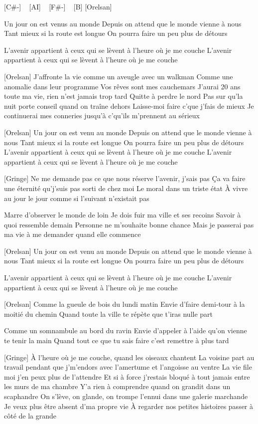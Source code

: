  
[C#-] ~ [AI] ~ [F#-] ~ [B]
 [Orelsan]

Un jour on est venus au monde
Depuis on attend que le monde vienne à nous
Tant mieux si la route est longue
On pourra faire un peu plus de détours

L'avenir appartient à ceux qui se lèvent à l'heure où je me couche
L'avenir appartient à ceux qui se lèvent à l'heure où je me couche

[Orelsan]
J'affronte la vie comme un aveugle avec un walkman
Comme une anomalie dans leur programme
Vos rêves sont mes cauchemars
J'aurai 20 ans toute ma vie, rien n'est jamais trop tard
Quitte à perdre le nord
Pas sur qu'la nuit porte conseil quand on traîne dehors
Laisse-moi faire c'que j'fais de mieux
Je continuerai mes conneries jusqu'à c'qu'ils m'prennent au sérieux


[Orelsan]
Un jour on est venu au monde
Depuis on attend que le monde vienne à nous
Tant mieux si la route est longue
On pourra faire un peu plus de détours
L'avenir appartient à ceux qui se lèvent à l'heure où je me couche
L'avenir appartient à ceux qui se lèvent à l'heure où je me couche

[Gringe]
Ne me demande pas ce que nous réserve l'avenir, j'sais pas
Ça va faire une éternité qu'j'suis pas sorti de chez moi
Le moral dans un triste état
À vivre au jour le jour comme si l'suivant n'existait pas

Marre d'observer le monde de loin
Je dois fuir ma ville et ses recoins
Savoir à quoi ressemble demain
Personne ne m'souhaite bonne chance
Mais je passerai pas ma vie à me demander quand elle commence

[Orelsan]
Un jour on est venu au monde
Depuis on attend que le monde vienne à nous
Tant mieux si la route est longue
On pourra faire un peu plus de détours

L'avenir appartient à ceux qui se lèvent à l'heure où je me couche
L'avenir appartient à ceux qui se lèvent à l'heure où je me couche


[Orelsan]
Comme la gueule de bois du lundi matin
Envie d'faire demi-tour à la moitié du chemin
Quand toute la ville te répète que t'iras nulle part

Comme un somnambule au bord du ravin
Envie d'appeler à l'aide qu'on vienne te tenir la main
Quand tout ce que tu sais faire c'est remettre à plus tard

[Gringe]
À l'heure où je me couche, quand les oiseaux chantent
La voisine part au travail pendant que j'm'endors avec l'amertume et l'angoisse au ventre
La vie file moi j'en peux plus de l'attendre
Et si à force j'restais bloqué à tout jamais entre les murs de ma chambre
Y'a rien à comprendre quand on grandit dans un scaphandre
On s'lève, on glande, on trompe l'ennui dans une galerie marchande
Je veux plus être absent d'ma propre vie
À regarder nos petites histoires passer à côté de la grande

